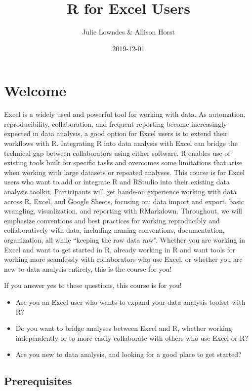 \documentclass[]{book}
\title{R for Excel Users}
\author{Julie Lowndes \& Allison Horst}
\date{2019-12-01}
\providecommand{\tightlist}{%
  \setlength{\itemsep}{0pt}\setlength{\parskip}{0pt}}
\begin{document}
\maketitle

{
\setcounter{tocdepth}{1}
\tableofcontents
}
\hypertarget{welcome}{%
\chapter{Welcome}\label{welcome}}

Excel is a widely used and powerful tool for working with data. As automation, reproducibility, collaboration, and frequent reporting become increasingly expected in data analysis, a good option for Excel users is to extend their workflows with R. Integrating R into data analysis with Excel can bridge the technical gap between collaborators using either software. R enables use of existing tools built for specific tasks and overcomes some limitations that arise when working with large datasets or repeated analyses. This course is for Excel users who want to add or integrate R and RStudio into their existing data analysis toolkit. Participants will get hands-on experience working with data across R, Excel, and Google Sheets, focusing on: data import and export, basic wrangling, visualization, and reporting with RMarkdown. Throughout, we will emphasize conventions and best practices for working reproducibly and collaboratively with data, including naming conventions, documentation, organization, all while ``keeping the raw data raw''. Whether you are working in Excel and want to get started in R, already working in R and want tools for working more seamlessly with collaborators who use Excel, or whether you are new to data analysis entirely, this is the course for you!

If you answer yes to these questions, this course is for you!

\begin{itemize}
\tightlist
\item
  Are you an Excel user who wants to expand your data analysis toolset with R?
\item
  Do you want to bridge analyses between Excel and R, whether working independently or to more easily collaborate with others who use Excel or R?
\item
  Are you new to data analysis, and looking for a good place to get started?
\end{itemize}

\hypertarget{prerequisites}{%
\section{Prerequisites}\label{prerequisites}}
\end{document}
